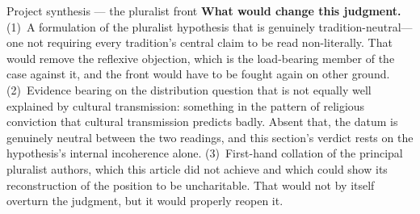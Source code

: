 \begin{studybox}{Project synthesis --- the pluralist front}
\textbf{What would change this judgment.} (1)~A formulation of the pluralist hypothesis that is genuinely tradition-neutral---one not requiring every tradition's central claim to be read non-literally. That would remove the reflexive objection, which is the load-bearing member of the case against it, and the front would have to be fought again on other ground. (2)~Evidence bearing on the distribution question that is not equally well explained by cultural transmission: something in the pattern of religious conviction that cultural transmission predicts badly. Absent that, the datum is genuinely neutral between the two readings, and this section's verdict rests on the hypothesis's internal incoherence alone. (3)~First-hand collation of the principal pluralist authors, which this article did not achieve and which could show its reconstruction of the position to be uncharitable. That would not by itself overturn the judgment, but it would properly reopen it.
\end{studybox}
